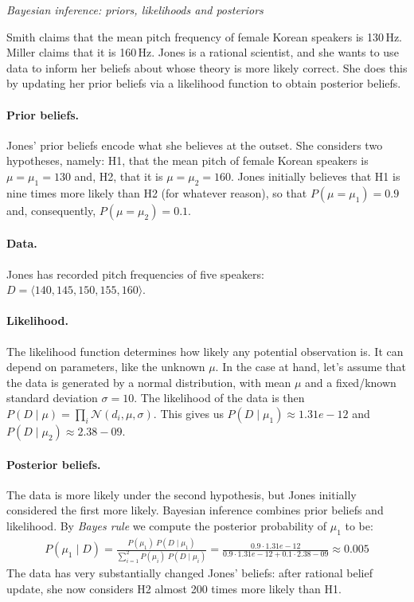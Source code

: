 \documentclass[nobib]{tufte-handout}
\begin{document}
\begin{InfoBox}[]
\centering
\colorbox{mygray}{\centering
  \begin{minipage}{1.0\textwidth}

    \emph{Bayesian inference: priors, likelihoods and posteriors}
    \medskip

    Smith claims that the mean pitch frequency of female Korean speakers is 130\,Hz. Miller claims that it is 160\,Hz. Jones is a rational scientist, and she wants to use data to inform her beliefs about whose theory is more likely correct. She does this by updating her prior beliefs via a likelihood function to obtain posterior beliefs.    
   
    \paragraph{Prior beliefs.} Jones' prior beliefs encode what she believes at the outset. She
    considers two hypotheses, namely: H1, that the mean pitch of female Korean speakers is $\mu
    = \mu_1 = 130$ and, H2, that it is $\mu = \mu_2 = 160$.  Jones initially believes that H1 is nine times more likely than H2 (for whatever reason), so that $P(\mu = \mu_1) = 0.9$ and, consequently, $P(\mu = \mu_2) = 0.1$.

    \paragraph{Data.} Jones has recorded pitch frequencies of five speakers: \\ $D = \langle 140, 145, 150, 155, 160 \rangle$.
    
    \paragraph{Likelihood.} The likelihood function determines how likely any potential
    observation is. It can depend on parameters, like the unknown $\mu$. In the case at hand,
    let's assume that the data is generated by a normal distribution, with mean $\mu$ and a
    fixed/known standard deviation $\sigma = 10$. The likelihood of the data is then $P(D \mid
    \mu) = \prod_{i} \mathcal{N}(d_i, \mu, \sigma)$. This gives us $P(D \mid \mu_1) \approx
    1.31e-12$ and $P(D \mid \mu_2) \approx 2.38-09$.

     \paragraph{Posterior beliefs.} The data is more likely under the second hypothesis, but Jones initially considered the first more likely. Bayesian inference combines prior beliefs and likelihood. By \emph{Bayes rule} we compute the posterior probability of $\mu_1$ to be:
     \begin{align*}
       P(\mu_1 \mid D) = \frac{P(\mu_1) \ P(D \mid \mu_1)}{ \sum_{i =1}^2 P(\mu_i) \ P(D \mid \mu_i)} = \frac{0.9 \cdot 1.31e-12}{ 0.9 \cdot 1.31e-12 + 0.1 \cdot 2.38-09} \approx 0.005
     \end{align*}
     The data has very substantially changed Jones' beliefs: after rational belief update, she now considers H2 almost 200 times more likely than H1.
     

\end{minipage}}
\end{InfoBox}
\end{document}
